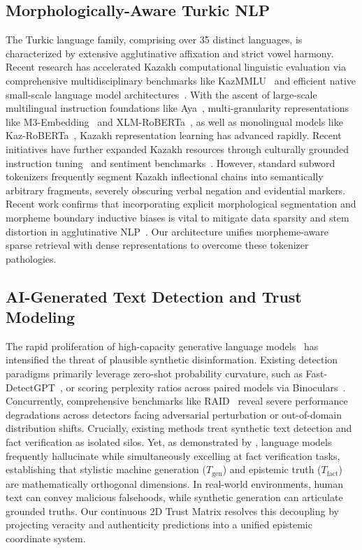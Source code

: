 \subsection{Morphologically-Aware Turkic NLP}
The Turkic language family, comprising over 35 distinct languages, is characterized by extensive agglutinative affixation and strict vowel harmony. Recent research has accelerated Kazakh computational linguistic evaluation via comprehensive multidisciplinary benchmarks like KazMMLU~\citep{togmanov-etal-2025-kazmmlu} and efficient native small-scale language model architectures~\citep{tukenov2026sozkz}. With the ascent of large-scale multilingual instruction foundations like Aya~\citep{ustun-etal-2024-aya}, multi-granularity representations like M3-Embedding~\citep{chen-etal-2024-m3} and XLM-RoBERTa~\citep{conneau2020xlmr}, as well as monolingual models like Kaz-RoBERTa~\citep{sagyndyk2025kazroberta}, Kazakh representation learning has advanced rapidly. Recent initiatives have further expanded Kazakh resources through culturally grounded instruction tuning~\citep{laiyk-etal-2025-instruction} and sentiment benchmarks~\citep{yeshpanov2024kazsandra}. However, standard subword tokenizers frequently segment Kazakh inflectional chains into semantically arbitrary fragments, severely obscuring verbal negation and evidential markers. Recent work confirms that incorporating explicit morphological segmentation and morpheme boundary inductive biases is vital to mitigate data sparsity and stem distortion in agglutinative NLP~\citep{guo2026kazakh}. Our architecture unifies morpheme-aware sparse retrieval with dense representations to overcome these tokenizer pathologies.

\subsection{AI-Generated Text Detection and Trust Modeling}
The rapid proliferation of high-capacity generative language models~\citep{dubey2024llama3} has intensified the threat of plausible synthetic disinformation. Existing detection paradigms primarily leverage zero-shot probability curvature, such as Fast-DetectGPT~\citep{bao2024fastdetectgpt}, or scoring perplexity ratios across paired models via Binoculars~\citep{hans2024binoculars}. Concurrently, comprehensive benchmarks like RAID~\citep{wang2024raid} reveal severe performance degradations across detectors facing adversarial perturbation or out-of-domain distribution shifts. Crucially, existing methods treat synthetic text detection and fact verification as isolated silos. Yet, as demonstrated by \citet{guan-etal-2024-language}, language models frequently hallucinate while simultaneously excelling at fact verification tasks, establishing that stylistic machine generation ($T_{\text{gen}}$) and epistemic truth ($T_{\text{fact}}$) are mathematically orthogonal dimensions. In real-world environments, human text can convey malicious falsehoods, while synthetic generation can articulate grounded truths. Our continuous 2D Trust Matrix resolves this decoupling by projecting veracity and authenticity predictions into a unified epistemic coordinate system.
